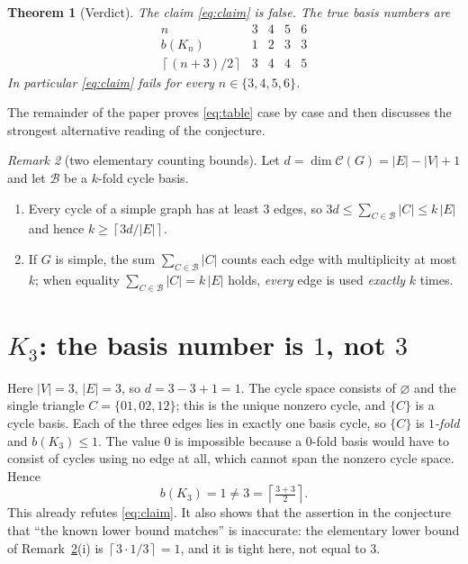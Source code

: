 \documentclass[11pt]{article}
\newtheorem{theorem}{Theorem}
\theoremstyle{definition}
\theoremstyle{remark}
\newtheorem{remark}[theorem]{Remark}
\newcommand{\Kn}{K_n}
\newcommand{\ceil}[1]{\left\lceil #1 \right\rceil}
\begin{document}
\begin{theorem}[Verdict]\label{thm:verdict}
The claim \eqref{eq:claim} is false. The true basis numbers are
\begin{equation}\label{eq:table}
\begin{array}{c|cccc}
 n & 3 & 4 & 5 & 6\\ \hline
 b(\Kn) & 1 & 2 & 3 & 3\\
 \ceil{(n+3)/2} & 3 & 4 & 4 & 5
\end{array}
\end{equation}
In particular \eqref{eq:claim} fails for every $n\in\{3,4,5,6\}$.
\end{theorem}

The remainder of the paper proves \eqref{eq:table} case by case and then
discusses the strongest alternative reading of the conjecture.

\begin{remark}[two elementary counting bounds]
\label{rem:counting}
Let $d = \dim\mathcal{C}(G) = |E|-|V|+1$ and let $\mathcal{B}$ be a $k$-fold
cycle basis.
\begin{enumerate}[label=(\roman*)]
\item Every cycle of a simple graph has at least $3$ edges, so
  $3d \le \sum_{C\in\mathcal{B}} |C| \le k\,|E|$ and hence
  $k \ge \ceil{3d/|E|}$.
\item If $G$ is simple, the sum $\sum_{C\in\mathcal{B}}|C|$ counts each edge
  with multiplicity at most $k$; when equality
  $\sum_{C\in\mathcal{B}}|C| = k\,|E|$ holds, \emph{every} edge is used
  \emph{exactly} $k$ times.
\end{enumerate}
\end{remark}

\section{$K_3$: the basis number is $1$, not $3$}

Here $|V|=3$, $|E|=3$, so $d = 3-3+1 = 1$. The cycle space consists of
$\varnothing$ and the single triangle $C = \{01,02,12\}$; this is the unique
nonzero cycle, and $\{C\}$ is a cycle basis. Each of the three edges lies in
exactly one basis cycle, so $\{C\}$ is \emph{$1$-fold} and $b(K_3)\le 1$. The
value $0$ is impossible because a $0$-fold basis would have to consist of
cycles using no edge at all, which cannot span the nonzero cycle space. Hence
\[
  b(K_3)=1 \neq 3 = \ceil{\tfrac{3+3}{2}}.
\]
This already refutes \eqref{eq:claim}. It also shows that the assertion in the
conjecture that ``the known lower bound matches'' is inaccurate: the
elementary lower bound of Remark~\ref{rem:counting}(i) is
$\ceil{3\cdot 1/3}=1$, and it is tight here, not equal to $3$.
\end{document}
